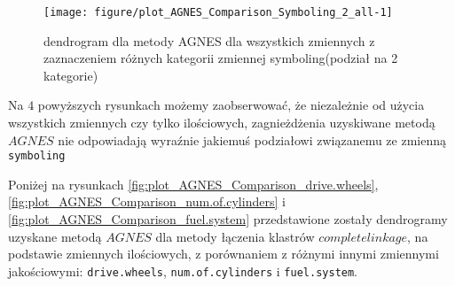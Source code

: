 \documentclass[12pt, a4paper]{article}\usepackage[]{graphicx}\usepackage[]{xcolor}
\makeatletter
\def\maxwidth{ %
  \ifdim\Gin@nat@width>\linewidth
    \linewidth
  \else
    \Gin@nat@width
  \fi
}
\newenvironment{knitrout}{}{} %
\makeatother
\begin{document}
\begin{knitrout}
\color{fgcolor}\begin{figure}[H]

{\centering \texttt{[image: figure/plot\_AGNES\_Comparison\_Symboling\_2\_all-1]} 

}

\caption[dendrogram dla metody AGNES dla wszystkich zmiennych z zaznaczeniem różnych kategorii zmiennej symboling(podział na 2 kategorie)]{dendrogram dla metody AGNES dla wszystkich zmiennych z zaznaczeniem różnych kategorii zmiennej symboling(podział na 2 kategorie)}\label{fig:plot_AGNES_Comparison_Symboling_2_all}
\end{figure}

\end{knitrout}
Na $4$ powyższych rysunkach możemy zaobserwować, że niezależnie od użycia wszystkich zmiennych czy tylko ilościowych, zagnieżdżenia uzyskiwane metodą $AGNES$ nie odpowiadają wyraźnie jakiemuś podziałowi związanemu ze zmienną \texttt{symboling}


\par
Poniżej na rysunkach \ref{fig:plot_AGNES_Comparison_drive.wheels}, \ref{fig:plot_AGNES_Comparison_num.of.cylinders} i \ref{fig:plot_AGNES_Comparison_fuel.system}  przedstawione zostały dendrogramy uzyskane metodą $AGNES$ dla metody łączenia klastrów $complete linkage$, na podstawie zmiennych ilościowych, z porównaniem z różnymi innymi zmiennymi jakościowymi: \texttt{drive.wheels}, \texttt{num.of.cylinders} i \texttt{fuel.system}.
\end{document}

